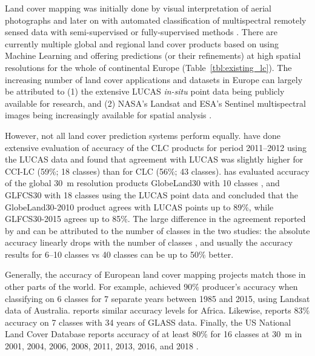 Land cover mapping was initially done by visual interpretation of aerial photographs and later on with automated classification of multispectral remotely sensed data with semi-supervised or fully-supervised methods \citep{townshend2012global, feranec2016european, liu2021finer}. There are currently multiple global \citep{feng2019global,buchhorn2020copernicus} and regional \citep{homer2007completion,batista2013procedure,pflugmacher2019mapping,malinowski2020,dandrimont2021lucas} land cover products based on using Machine Learning and offering predictions (or their refinements) at high spatial resolutions for the whole of continental Europe (Table\@~\ref{tbl:existing_lc}). The increasing number of land cover applications and datasets in Europe can largely be attributed to (1) the extensive LUCAS \emph{in-situ} point data being publicly available for research, and (2) NASA's Landsat and ESA's Sentinel multispectral images being increasingly available for spatial analysis \citep{szantoi2020addressing,liu2021finer}.
    
However, not all land cover prediction systems perform equally. \citet{vilar2019comparative} have done extensive evaluation of accuracy of the CLC products for period 2011--2012 using the LUCAS data and found that agreement with LUCAS was slightly higher for CCI-LC (59\%; 18 classes) than for CLC (56\%; 43 classes). \citet{gao2020consistency} has evaluated accuracy of the global 30~m resolution products GlobeLand30 with 10 classes \citep{chen2015global}, and GLFCS30 with 18 classes \citep{zhang2020glcfcs30} using the LUCAS point data and concluded that the GlobeLand30-2010 product agrees with LUCAS points up to 89\%, while GLFCS30-2015 agrees up to 85\%. The large difference in the agreement reported by \citet{vilar2019comparative} and \citet{chen2015global} can be attributed to the number of classes in the two studies: the absolute accuracy linearly drops with the number of classes \citep{herold2008some,van2019does}, and usually the accuracy results for 6--10 classes vs 40 classes can be up to 50\% better. 
    
Generally, the accuracy of European land cover mapping projects match those in other parts of the world. For example, \citet{calderon2021high} achieved 90\% producer's accuracy when classifying on 6 classes for 7 separate years between 1985 and 2015, using Landsat data of Australia. \citet{tsendbazar2018developing} reports similar accuracy levels for Africa. Likewise, \citet{liu2020annual} reports 83\% accuracy on 7 classes with 34 years of GLASS data. Finally, the US National Land Cover Database reports accuracy of at least 80\% for 16 classes at 30~m in 2001, 2004, 2006, 2008, 2011, 2013, 2016, and 2018 \citep{homer2020conterminous}.
    
